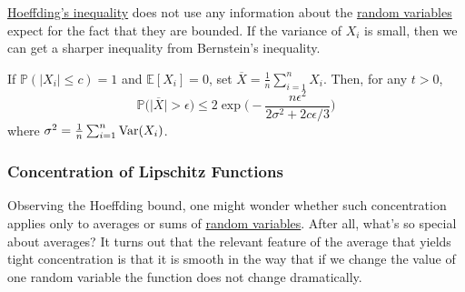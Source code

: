     \hyperref[thm:independent-common-mean]{Hoeffding's inequality} does not use any information about the \hyperref[def:random-variable]{random variables} expect for the fact that they are bounded. If the variance of $X_i$ is small, then we can get a sharper inequality from Bernstein's inequality. 

    \begin{theorem}
      \label{thm:bernsteins-inequality}
      If $\mathbb{P}(|X_i| \leq c) = 1$ and $\mathbb{E}[X_i] = 0$, set $\overline{X} = \frac{1}{n} \sum_{i=1}^n X_i$. Then, for any $t > 0$, 
      \begin{equation}
        \mathbb{P} \big( \big| \overline{X} \big| > \epsilon \big) \leq 2 \exp \bigg( - \frac{n \epsilon^2}{2 \sigma^2 + 2 c \epsilon /3} \bigg)
      \end{equation}
      where $\sigma^2 = \frac{1}{n} \sum_{i=1}^n \operatorname{Var}(X_i)$. 
    \end{theorem}

  \subsubsection{Concentration of Lipschitz Functions}

    Observing the Hoeffding bound, one might wonder whether such concentration applies only to averages or sums of \hyperref[def:random-variable]{random variables}. After all, what's so special about averages? It turns out that the relevant feature of the average that yields tight concentration is that it is smooth in the way that if we change the value of one random variable the function does not change dramatically. 

